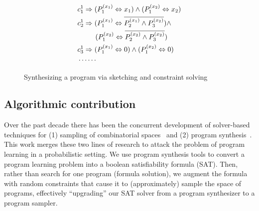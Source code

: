 \documentclass{article}
\begin{document}
\begin{figure}
{\[\begin{aligned}
      &c_1^1\Rightarrow (P_1^{(x_1)}\Leftrightarrow x_1)\wedge (P_1^{(x_2)}\Leftrightarrow x_2)\\
      & c_2^1\Rightarrow (P_1^{(x_1)}\Leftrightarrow \overline{P_2^{(x_1)}\wedge P_3^{(x_2)}})\wedge\\
&\hspace{0.9cm}      (P_1^{(x_2)}\Leftrightarrow \overline{P_2^{(x_2)}\wedge P_3^{(x_2)}})\\
      &c_3^1\Rightarrow (P_1^{(x_1)}\Leftrightarrow 0)\wedge (P_1^{(x_2)}\Leftrightarrow 0)\\
      &\cdots\cdots
    \end{aligned} \]}\quad
  \caption{Synthesizing a program via sketching and constraint solving}
\end{figure}


\subsection{Algorithmic contribution}
Over the past decade there has been the concurrent development of solver-based %
 techniques for (1) sampling of combinatorial spaces~\cite{gomes2006near,ermon2013embed,ermon2012uniform,chakraborty2014balancing} and (2) program synthesis~\cite{solar2008program,Gulwani:2011:SLP:1993498.1993506}.
This work merges these two lines of research to attack the problem of program learning in a probabilistic setting.
We use program synthesis tools to convert a program learning problem into a boolean satisfiability formula (SAT).
Then,
rather than search for one program (formula solution),
we augment the formula with random constraints that cause it to (approximately) sample the space of programs,
effectively ``upgrading'' our SAT solver from a program synthesizer to a program sampler.
\end{document}
